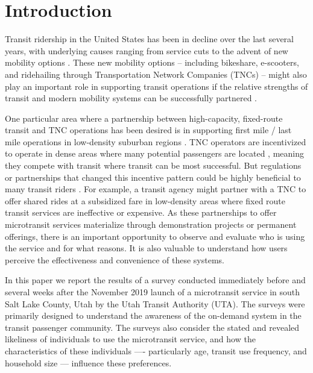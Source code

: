 \documentclass[smartcities,article,submit,moreauthors,pdftex]{mdpi}
\begin{document}

\hypertarget{intro}{%
\section{Introduction}\label{intro}}

Transit ridership in the United States has been in decline over the last several
years, with underlying causes ranging from service cuts to the advent of new
mobility options \citep{Graehler2019, Mallett2018}. These new mobility options --
including bikeshare, e-scooters, and ridehailing through Transportation Network
Companies (TNCs) -- might also play an important role in supporting transit
operations if the relative strengths of transit and modern mobility systems can
be successfully partnered \citep{Shaheen2016, OOSTENDORP201872, ShivThesis}.

One particular area where a partnership between high-capacity, fixed-route
transit and TNC operations has been desired is in supporting first mile / last
mile operations in low-density suburban regions \citep{Shaheen2016, alonso2018, Kang2020}. TNC operators are incentivized to operate in dense areas where many
potential passengers are located \citep{Wong2020}, meaning they compete with transit
where transit can be most successful. But regulations or partnerships that
changed this incentive pattern could be highly beneficial to many transit riders
\citep{Ronald2017, Deakin2010}. For example, a transit agency might partner with a
TNC to offer shared rides at a subsidized fare in low-density areas where fixed
route transit services are ineffective or expensive. As these partnerships to
offer microtransit services materialize through demonstration projects or
permanent offerings, there is an important opportunity to observe and evaluate
who is using the service and for what reasons. It is also valuable to understand
how users perceive the effectiveness and convenience of these systems.

In this paper we report the results of a survey conducted immediately before and
several weeks after the November 2019 launch of a microtransit service in south
Salt Lake County, Utah by the Utah Transit Authority (UTA). The surveys were
primarily designed to understand the awareness of the on-demand system in the
transit passenger community. The surveys also consider the stated and revealed
likeliness of individuals to use the microtransit service, and how the
characteristics of these individuals ---- particularly age, transit use frequency,
and household size --- influence these preferences.
\end{document}
